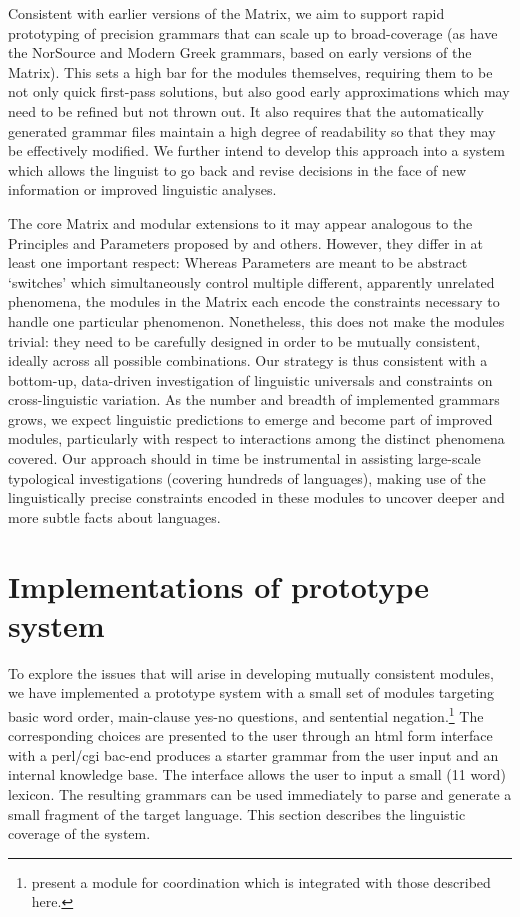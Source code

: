 \documentclass[11pt]{article}
\begin{document}
Consistent with earlier versions of the Matrix, we aim to support
rapid prototyping of precision grammars that can scale up to
broad-coverage (as have the NorSource \cite{Hel:Hau:03} and Modern
Greek \cite{Kor:Neu:2003} grammars, based on early versions of the
Matrix). This sets a high bar for the modules themselves, requiring
them to be not only quick first-pass solutions, but also good early
approximations which may need to be refined but not thrown out.  It
also requires that the automatically generated grammar files maintain
a high degree of readability so that they may be effectively modified.
We further intend to develop this approach into a system which allows
the linguist to go back and revise decisions in the face of new
information or improved linguistic analyses.

The core Matrix and modular extensions to it may appear 
analogous to the Principles and Parameters proposed by
 and others.  However, they differ in at least one
important respect: Whereas Parameters are meant to be abstract
`switches' which simultaneously control multiple different, 
apparently unrelated phenomena, the modules in the Matrix
each encode the constraints necessary to handle one
particular phenomenon.  Nonetheless, this does not make the modules
trivial: they need to be carefully designed in order to be
mutually consistent, ideally across all possible combinations.  Our
strategy is thus consistent with a bottom-up, data-driven
investigation of linguistic universals and constraints on
cross-linguistic variation.  As the number and breadth of implemented
grammars grows, we expect linguistic predictions to emerge and become
part of improved modules, particularly with respect to interactions
among the distinct phenomena covered.  Our approach
should in time be instrumental in assisting large-scale typological
investigations (covering hundreds of languages), making use of the
linguistically precise constraints encoded in these modules to uncover
deeper and more subtle facts about languages.

\section{Implementations of prototype system}
\label{imp}

To explore the issues that will arise in developing
mutually consistent modules, we have implemented a prototype system
with a small set of modules targeting basic word order, main-clause
yes-no questions, and sentential
negation.\footnote{ present a module for
coordination which is integrated with those described here.}  The
corresponding choices are presented to the user through an html form
interface with a perl/cgi bac-end produces a starter grammar from the
user input and an internal knowledge base.  The interface allows the
user to input a small (11 word) lexicon.  The resulting
grammars can be used immediately to parse and generate a small
fragment of the target language.  This section describes the
linguistic coverage of the system.
\end{document}
